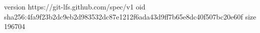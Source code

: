 version https://git-lfs.github.com/spec/v1
oid sha256:4fa9f23b2dc9eb2d983532dc87e1212f6ada43d9ff7b65e8dc40f507bc20e60f
size 196704
